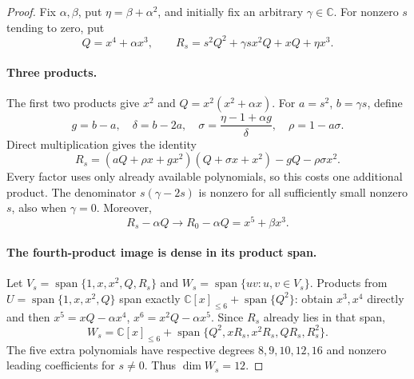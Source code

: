\documentclass[11pt]{article}
\newcommand{\C}{\mathbb C}
\newcommand{\V}[1]{\C[x]_{\le #1}}
\newcommand{\Span}{\operatorname{span}}
\begin{document}
\begin{proof}
Fix $\alpha,\beta$, put $\eta=\beta+\alpha^2$, and initially fix an
arbitrary $\gamma\in\C$. For nonzero $s$ tending to zero, put
\begin{equation}\label{eq:QR}
 Q=x^4+\alpha x^3,\qquad
 R_s=s^2Q^2+\gamma s x^2Q+xQ+\eta x^3.
\end{equation}

\paragraph{Three products.}
The first two products give $x^2$ and $Q=x^2(x^2+\alpha x)$.
For $a=s^2$, $b=\gamma s$, define
\[
 g=b-a,\quad \delta=b-2a,\quad
 \sigma=\frac{\eta-1+\alpha g}{\delta},\quad \rho=1-a\sigma.
\]
Direct multiplication gives the identity
\begin{equation}\label{eq:third}
 R_s=(aQ+\rho x+g x^2)(Q+\sigma x+x^2)-gQ-\rho\sigma x^2.
\end{equation}
Every factor uses only already available polynomials, so this costs one
additional product. The denominator $s(\gamma-2s)$ is nonzero for all
sufficiently small nonzero $s$, also when $\gamma=0$. Moreover,
\begin{equation}\label{eq:Rlimit}
 R_s-\alpha Q\longrightarrow R_0-\alpha Q=x^5+\beta x^3.
\end{equation}

\paragraph{The fourth-product image is dense in its product span.}
Let $V_s=\Span\{1,x,x^2,Q,R_s\}$ and
$W_s=\Span\{uv:u,v\in V_s\}$. Products from
$U=\Span\{1,x,x^2,Q\}$ span exactly
$\V6+\Span\{Q^2\}$: obtain $x^3,x^4$ directly and then
$x^5=xQ-\alpha x^4$, $x^6=x^2Q-\alpha x^5$.
Since $R_s$ already lies in that span,
\begin{equation}\label{eq:W}
 W_s=\V6+\Span\{Q^2,xR_s,x^2R_s,QR_s,R_s^2\}.
\end{equation}
The five extra polynomials have respective degrees $8,9,10,12,16$ and
nonzero leading coefficients for $s\ne0$. Thus $\dim W_s=12$.


\end{proof}
\end{document}
